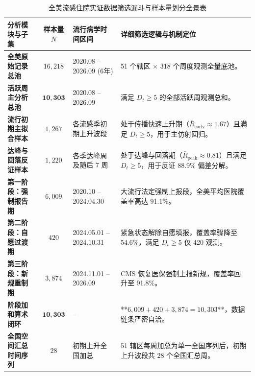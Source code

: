 \begin{table}[htbp]
\centering
\small
\caption{全美流感住院实证数据筛选漏斗与样本量划分全景表}
\label{tab:sample_funnel}
\begin{tabularx}{\textwidth}{lcXX}
\toprule
\textbf{分析模块与子集} & \textbf{样本量 $N$} & \textbf{流行病学时间区间} & \textbf{详细筛选逻辑与机制定位} \\
\midrule
\textbf{全美原始记录总池} & $16{,}218$ & 2020.08 -- 2026.09 (6年) & 51 个辖区 $\times$ 318 个周度观测全量底池。 \\
\textbf{活跃周主分析总池} & $\mathbf{10{,}303}$ & 2020.08 -- 2026.09 & 满足 $D_t \ge 5$ 的全部活跃周观测总和。 \\
\midrule
\textbf{流行初期主拟合样本} & $1{,}267$ & 各流感季初期上升波段 & 处于传播快速上升期（$\bar{R}_{\text{early}} \approx 1.67$）且满足 $D_t \ge 5$，用于主仿射回归。 \\
\textbf{达峰与回落反证样本} & $1{,}220$ & 各季达峰周及随后 7 周 & 处于达峰与回落期（$\bar{R}_{\text{peak}} \approx 0.81$）且满足 $D_t \ge 5$，用于反证 88.9\% 偏差分解。 \\
\midrule
\textbf{第一阶段：强制报告期} & $6{,}009$ & 2020.10 -- 2024.04.30 & 大流行法定强制上报段，全美平均医院覆盖率高达 91.1\%。 \\
\textbf{第二阶段：自愿过渡期} & $420$ & 2024.05.01 -- 2024.10.31 & 紧急状态解除自愿填报，覆盖率骤降至 54.6\%，满足 $D_t \ge 5$ 仅 420 观测。 \\
\textbf{第三阶段：新规重制期} & $3{,}874$ & 2024.11.01 -- 2026.09 & CMS 恢复医保强制上报新规，覆盖率回升至 91.8\%。 \\
\textbf{阶段加和算术闭环} & $\mathbf{10{,}303}$ & -- & **$6{,}009 + 420 + 3{,}874 = 10{,}303$**，数据链条严密自洽。 \\
\midrule
\textbf{全国空间汇总时间序列} & $28$ & 初期上升全国加总 & 51 辖区每周加总为单一全国序列后，初期上升波段共 28 个全国汇总周。 \\
\bottomrule
\end{tabularx}
\end{table}


